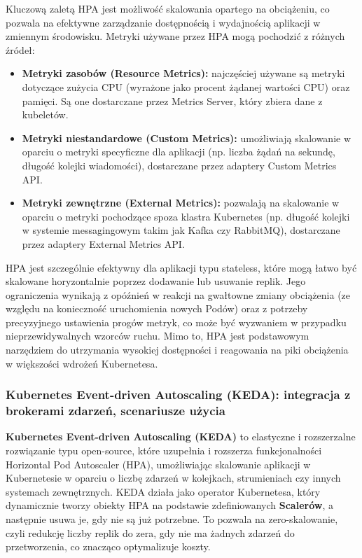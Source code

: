 Kluczową zaletą HPA jest możliwość skalowania opartego na obciążeniu, co pozwala na efektywne zarządzanie dostępnością i wydajnością aplikacji w zmiennym środowisku. Metryki używane przez HPA mogą pochodzić z różnych źródeł:
\begin{itemize}
    \item \textbf{Metryki zasobów (Resource Metrics):} najczęściej używane są metryki dotyczące zużycia CPU (wyrażone jako procent żądanej wartości CPU) oraz pamięci. Są one dostarczane przez Metrics Server, który zbiera dane z kubeletów.
    \item \textbf{Metryki niestandardowe (Custom Metrics):} umożliwiają skalowanie w oparciu o metryki specyficzne dla aplikacji (np. liczba żądań na sekundę, długość kolejki wiadomości), dostarczane przez adaptery Custom Metrics API.
    \item \textbf{Metryki zewnętrzne (External Metrics):} pozwalają na skalowanie w oparciu o metryki pochodzące spoza klastra Kubernetes (np. długość kolejki w systemie messagingowym takim jak Kafka czy RabbitMQ), dostarczane przez adaptery External Metrics API.
\end{itemize}
HPA jest szczególnie efektywny dla aplikacji typu stateless, które mogą łatwo być skalowane horyzontalnie poprzez dodawanie lub usuwanie replik. Jego ograniczenia wynikają z opóźnień w reakcji na gwałtowne zmiany obciążenia (ze względu na konieczność uruchomienia nowych Podów) oraz z potrzeby precyzyjnego ustawienia progów metryk, co może być wyzwaniem w przypadku nieprzewidywalnych wzorców ruchu. Mimo to, HPA jest podstawowym narzędziem do utrzymania wysokiej dostępności i reagowania na piki obciążenia w większości wdrożeń Kubernetesa.

\subsubsection{Kubernetes Event-driven Autoscaling (KEDA): integracja z brokerami zdarzeń, scenariusze użycia}
\textbf{Kubernetes Event-driven Autoscaling (KEDA)} to elastyczne i rozszerzalne rozwiązanie typu open-source, które uzupełnia i rozszerza funkcjonalności Horizontal Pod Autoscaler (HPA), umożliwiając skalowanie aplikacji w Kubernetesie w oparciu o liczbę zdarzeń w kolejkach, strumieniach czy innych systemach zewnętrznych. KEDA działa jako operator Kubernetesa, który dynamicznie tworzy obiekty HPA na podstawie zdefiniowanych \textbf{Scalerów}, a następnie usuwa je, gdy nie są już potrzebne. To pozwala na zero-skalowanie, czyli redukcję liczby replik do zera, gdy nie ma żadnych zdarzeń do przetworzenia, co znacząco optymalizuje koszty.

